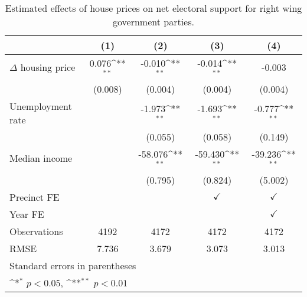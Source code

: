 \begin{table}[htbp]\centering
\def\sym#1{\ifmmode^{#1}\else\(^{#1}\)\fi}
\caption{Estimated effects of house prices on net electoral support for right wing government parties.} \label{prelagdv}
\begin{tabular}{l*{4}{c}}
\hline\hline
                    &\multicolumn{1}{c}{(1)}        &\multicolumn{1}{c}{(2)}        &\multicolumn{1}{c}{(3)}        &\multicolumn{1}{c}{(4)}        \\
\hline
$\Delta$ housing price&       0.076\sym{**}&      -0.010\sym{**}&      -0.014\sym{**}&      -0.003        \\
                    &     (0.008)        &     (0.004)        &     (0.004)        &     (0.004)        \\
[1em]
Unemployment rate   &                    &      -1.973\sym{**}&      -1.693\sym{**}&      -0.777\sym{**}\\
                    &                    &     (0.055)        &     (0.058)        &     (0.149)        \\
[1em]
Median income       &                    &     -58.076\sym{**}&     -59.430\sym{**}&     -39.236\sym{**}\\
                    &                    &     (0.795)        &     (0.824)        &     (5.002)        \\
[1em]
\hline Precinct FE  &                    &                    &$\checkmark$        &$\checkmark$        \\
[1em]
Year FE             &                    &                    &                    &$\checkmark$        \\
\hline
Observations        &        4192        &        4172        &        4172        &        4172        \\
RMSE                &       7.736        &       3.679        &       3.073        &       3.013        \\
\hline\hline
\multicolumn{5}{l}{\footnotesize Standard errors in parentheses}\\
\multicolumn{5}{l}{\footnotesize \sym{*} \(p<0.05\), \sym{**} \(p<0.01\)}\\
\end{tabular}
\end{table}
